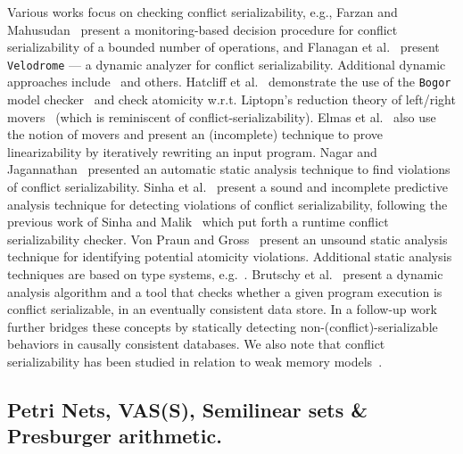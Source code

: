 Various works focus on checking conflict serializability, e.g., Farzan and 
Mahusudan~\cite{FaMa08} present a monitoring-based decision procedure for 
conflict serializability of a bounded number of operations, and Flanagan et 
al.~\cite{FlFrYi08} present \texttt{Velodrome} --- a dynamic analyzer for 
conflict 
serializability. Additional dynamic approaches include~\cite{FlFr04, XuBoRa05, 
WaSt06a, CoOlPnTuZu07, EmMaMa10, SiMaWaGu11a} and others.
%
%
Hatcliff et al.~\cite{HaRoDw04} demonstrate the use of the \texttt{Bogor} model 
checker~\cite{RoDwHa03} and check atomicity w.r.t. Liptopn's reduction theory 
of left/right movers~\cite{Li75} (which is reminiscent of 
conflict-serializability).
%
Elmas et al.~\cite{ElQaSeSuTa10} also use the notion of movers and present an 
(incomplete) technique to prove linearizability by iteratively rewriting an 
input program.
%
%
Nagar and Jagannathan~\cite{KaJa18} presented an 
automatic static analysis technique to find violations of conflict 
serializability.
%
Sinha et al.~\cite{SiMaWaGu11b} present a sound and incomplete predictive 
analysis technique for detecting violations of conflict serializability, 
following the previous work of Sinha and Malik~\cite{SiMa10} which put forth a 
runtime conflict serializability checker.
%
Von Praun and Gross~\cite{VoGr04} present an unsound static analysis technique 
for identifying potential atomicity violations. Additional static analysis 
techniques are based on type systems, e.g.~\cite{FlQa03, FlFrLiQa08}.
%
Brutschy et al.~\cite{BrDiMuVe17} present a dynamic analysis algorithm and a 
tool that checks whether a given program execution is conflict serializable, in 
an eventually consistent data store. In a follow-up work~\cite{BrDiMuVe18} 
further bridges these concepts by statically detecting 
non-(conflict)-serializable behaviors in causally consistent databases.
%
%
%
We also note that conflict serializability has been studied in relation to weak 
memory models~\cite{EnFa16}.
%





\subsection{Petri Nets, VAS(S), Semilinear sets  \& Presburger arithmetic.}
\label{sec:related:petri}

